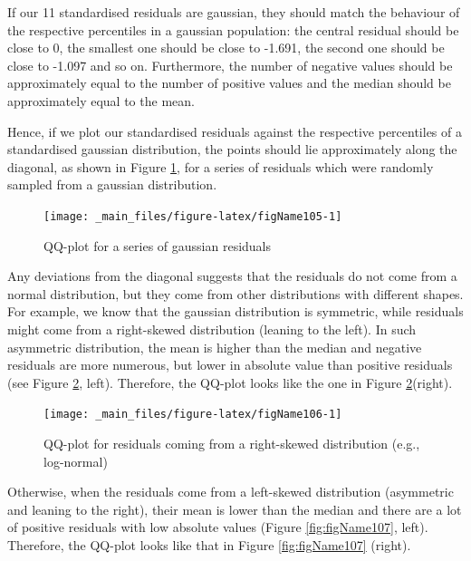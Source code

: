 \documentclass[a4paper,12pt,oneside]{book}
\begin{document}
If our 11 standardised residuals are gaussian, they should match the behaviour of the respective percentiles in a gaussian population: the central residual should be close to 0, the smallest one should be close to -1.691, the second one should be close to -1.097 and so on. Furthermore, the number of negative values should be approximately equal to the number of positive values and the median should be approximately equal to the mean.

Hence, if we plot our standardised residuals against the respective percentiles of a standardised gaussian distribution, the points should lie approximately along the diagonal, as shown in Figure \ref{fig:figName105}, for a series of residuals which were randomly sampled from a gaussian distribution.

\begin{figure}

{\centering \texttt{[image: \_main\_files/figure-latex/figName105-1]} 

}

\caption{QQ-plot for a series of gaussian residuals}\label{fig:figName105}
\end{figure}

Any deviations from the diagonal suggests that the residuals do not come from a normal distribution, but they come from other distributions with different shapes. For example, we know that the gaussian distribution is symmetric, while residuals might come from a right-skewed distribution (leaning to the left). In such asymmetric distribution, the mean is higher than the median and negative residuals are more numerous, but lower in absolute value than positive residuals (see Figure \ref{fig:figName106}, left). Therefore, the QQ-plot looks like the one in Figure \ref{fig:figName106}(right).

\begin{figure}

{\centering \texttt{[image: \_main\_files/figure-latex/figName106-1]} 

}

\caption{QQ-plot for residuals coming from a right-skewed distribution (e.g., log-normal)}\label{fig:figName106}
\end{figure}

Otherwise, when the residuals come from a left-skewed distribution (asymmetric and leaning to the right), their mean is lower than the median and there are a lot of positive residuals with low absolute values (Figure \ref{fig:figName107}, left). Therefore, the QQ-plot looks like that in Figure \ref{fig:figName107} (right).
\end{document}
